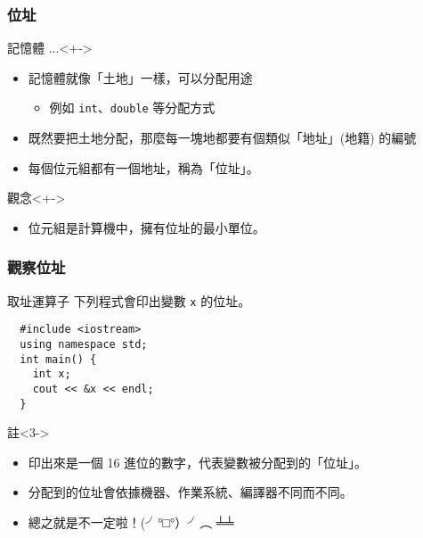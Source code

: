 \documentclass[utf8]{beamer}
\begin{document}
\begin{CJK}{UTF8}{bkai}
\begin{frame}[fragile]
  \frametitle{位址}
  \begin{block}{記憶體 ...}<+->
    \begin{itemize}[<+->]
    \item 記憶體就像「土地」一樣，可以分配用途
      \begin{itemize}
      \item 例如 \lstinline{int}{}、\lstinline{double}{} 等分配方式
      \end{itemize}
    \item 既然要把土地分配，那麼每一塊地都要有個類似「\alert{地址}」(地籍) 的編號
    \item 每個\alert{位元組}都有一個地址，稱為「\alert{位址}」。
    \end{itemize}
  \end{block}
  \begin{alertblock}{觀念}<+->
    \begin{itemize}
    \item 位元組是計算機中，\alert{擁有位址}的最小單位。
    \end{itemize}
  \end{alertblock}
\end{frame}

\begin{frame}[fragile]
  \frametitle{觀察位址}
  \begin{block}{取址運算子}
  下列程式會印出變數 \lstinline{x}{} 的位址。
  \pause
  \begin{lstlisting}
  #include <iostream>
  using namespace std;
  int main() {
    int x;
    cout << &x << endl;
  }
  \end{lstlisting}
  \end{block}
  \begin{exampleblock}{註}<3->
    \begin{itemize}
    \item 印出來是一個 16 進位的數字，代表變數被分配到的「位址」。
    \item<4-> 分配到的位址會依據機器、作業系統、編譯器不同而不同。
    \item<5-> 總之就是\alert{不一定}啦！(╯°□°）╯︵ ╧╧
    \end{itemize}
  \end{exampleblock}
\end{frame}


\end{CJK}
\end{document}
